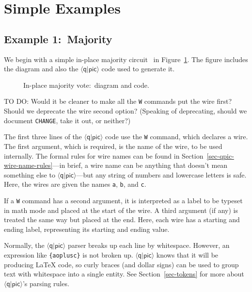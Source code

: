\documentclass[twoside,12pt]{article}
\newcommand{\qpic}{$\langle\mathsf{q}|\mathsf{pic}\rangle$\xspace}
\begin{document}
\section{Simple Examples}
\label{sec-example}
\subsection{Example 1:\ Majority}
\label{sec-example-maj}
We begin with a simple in-place majority circuit~\cite{CDKM} in Figure~\ref{fig-maj}.  The figure includes the diagram and also the \qpic code used to generate it.
\begin{figure}[h!]
\begin{center}


\begin{minipage}{2in}

\end{minipage}
\end{center}
\caption{In-place majority vote:\ diagram and code.}
\label{fig-maj}
\end{figure}

TO DO:  Would it be cleaner to make all the {\tt W} commands put the wire first?
Should we deprecate the wire second option?  (Speaking of deprecating, should we
document {\tt CHANGE}, take it out, or neither?)

The first three lines of the \qpic code use the {\tt W} command, which declares a wire.  The first argument, which is required, is the name of the wire, to be used internally.  The formal rules for wire names can be found in
Section~\ref{sec-qpic-wire-name-rules}---in brief, a wire name can be anything that doesn't mean something else to \qpic---but any string of numbers and lowercase
letters is safe.  Here, the wires are given the names {\tt a}, {\tt b}, and
{\tt c}.


If a {\tt W} command has a second argument, it is interpreted as a label to be
typeset in math mode and placed at the start of the wire.  A third argument (if any) is treated the same way but placed at the end.  Here, each wire has a starting and ending label, representing its starting and ending value.


Normally, the \qpic parser breaks up each line by whitespace.  However,
an expression like {\tt \{a{\textvisiblespace}{}oplus{\textvisiblespace}c\}} is not
broken up.  \qpic knows that it will be producing {\LaTeX} code, so curly
braces (and dollar signs) can be used to group text with whitespace into
a single entity.  See Section~\ref{sec-tokens} for more about \qpic's parsing
rules.
\end{document}
